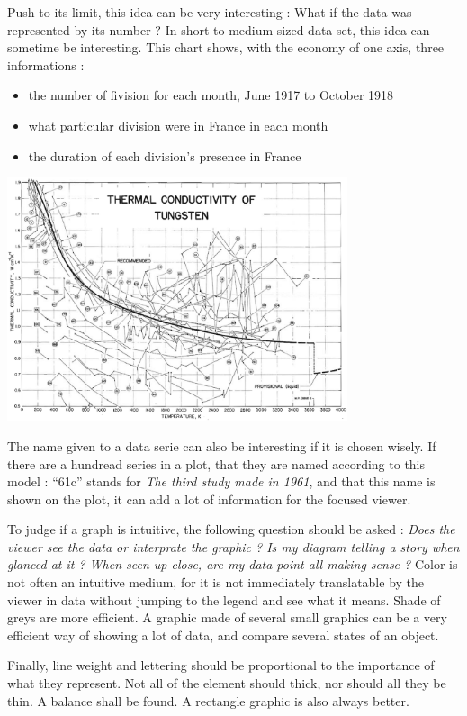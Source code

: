  Push to its limit, this idea can be very interesting : What if the data was represented by its number ? In short to medium sized data set, this idea can sometime be interesting.
 This chart shows, with the economy of one axis, three informations : 

\begin{itemize}
\item the number of fivision for each month, June 1917 to October 1918
\item what particular division were in France in each month
\item the duration of each division's presence in France
\end{itemize}

\centerline{
\includegraphics[width=10cm]{./illustrations/annexes/relationel_tungsten.eps}
}
The name given to a data serie can also be interesting if it is chosen wisely.
 If there are a hundread series in a plot, that they are named according to this model : ``61c'' stands for \emph{The third study made in 1961}, and that this name is shown on the plot, it can add a lot of information for the focused viewer.

To judge if a graph is intuitive, the following question should be asked : \emph{Does the viewer see the data or interprate the graphic ? Is my diagram telling a story when glanced at it ? When seen up close, are my data point all making sense ?}
 Color is not often an intuitive medium, for it is not immediately translatable by the viewer in data without jumping to the legend and see what it means. Shade of greys are more efficient. A graphic made of several small graphics can be a very efficient way of showing a lot of data, and compare several states of an object.

Finally, line weight and lettering should be proportional to the importance of what they represent. Not all of the element should thick, nor should all they be thin. A balance shall be found. A rectangle graphic is also always better.
